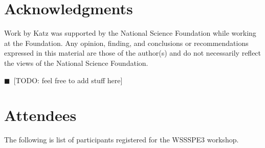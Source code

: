 \documentclass[11pt, oneside]{amsart}
\newcommand{\todo}[1]{{\color{blue}$\blacksquare$~\textsf{[TODO: #1]}}}
\begin{document}
\section*{Acknowledgments} \label{sec:acks}

Work by Katz was supported by the National Science Foundation while working at
the Foundation. Any opinion, finding, and conclusions or recommendations
expressed in this material are those of the author(s) and do not necessarily
reflect the views of the National Science Foundation.

\todo{feel free to add stuff here}


\appendix
\section{Attendees}  \label{sec:attendees}
The following is list of participants registered for the WSSSPE3 workshop.

{\scriptsize
\begin{longtable}{lll}

\end{longtable}
}



%












\end{document}
